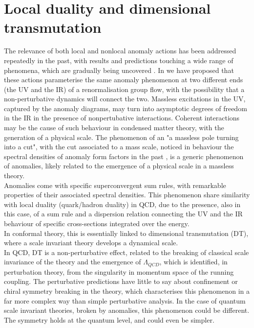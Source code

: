 \documentclass[a4paper,11pt,openright,twoside]{book}
\numberwithin{equation}{section}
\begin{document}
\section*{Local duality and dimensional transmutation}
The relevance of both local and nonlocal anomaly actions has been addressed repeatedly in the past, with results and predictions touching a wide range of phenomena, 
which are gradually being uncovered \cite{Chernodub:2019tsx,Mottola:2019nui,Mottola:2016mpl}. In \cite{Coriano:2019dyc} we have proposed that these actions parameterise the same anomaly phenomenon at two different ends (the UV and the IR) of a renormalisation group flow, with the possibility that a non-perturbative dynamics will connect the two. Massless excitations in the UV, captured by the anomaly diagrams, may turn into asymptotic degrees of freedom in the IR in the presence of nonpertubative interactions. Coherent interactions may be the cause of such behaviour in condensed matter theory, with the generation of a physical scale. The phenomenon of an "a  massless pole turning into a cut", with the cut associated to a mass scale, noticed in behaviour the spectral densities of anomaly form factors in the past \cite{Giannotti:2008cv,Coriano:2014gja}, is a generic phenomenon of anomalies, likely related to the emergence of a physical scale in a massless theory. \\
Anomalies come with specific superconvergent sum rules, with remarkable properties of their associated spectral densities. This phenomenon share similarity with local duality (quark/hadron duality) in QCD, due to the presence, also in this case, of a sum rule and a dispersion relation connecting the UV and the IR behaviour of specific cross-sections integrated over the energy.\\
In conformal theory, this is essentially linked to dimensional transmutation (DT), 
where a scale invariant theory develops a dynamical scale. \\
In QCD, DT is a non-perturbative effect, related to the breaking of classical scale invariance of the theory and the emergence of $\Lambda_{QCD}$, which is identified, in perturbation theory, from the singularity in momentum space of the running coupling. The perturbative predictions have little to say about confinement or chiral symmetry breaking in the theory, which characterises this phenomenon in a far more complex way than simple perturbative analysis.
In the case of quantum scale invariant theories, broken by anomalies, this phenomenon could be different. The symmetry holds at the quantum level, and could even be simpler.     
\end{document}
